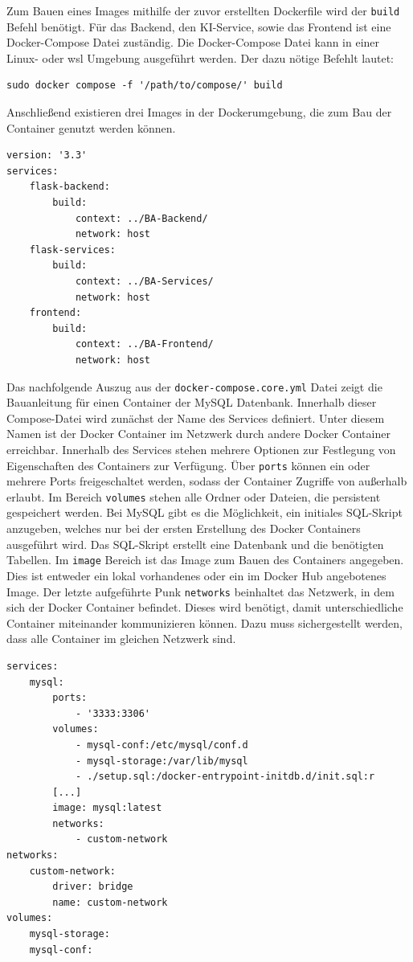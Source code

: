 Zum Bauen eines Images mithilfe der zuvor erstellten Dockerfile wird der \texttt{build} Befehl benötigt. Für das Backend, den KI-Service, sowie das Frontend ist eine Docker-Compose Datei zuständig. Die Docker-Compose Datei kann in einer Linux- oder \ac{wsl} Umgebung ausgeführt werden. Der dazu nötige Befehlt lautet:
\begin{lstlisting}
sudo docker compose -f '/path/to/compose/' build
\end{lstlisting}
Anschließend existieren drei Images in der Dockerumgebung, die zum Bau der Container genutzt werden können. 

\begin{lstlisting}
version: '3.3'
services: 
    flask-backend:
        build: 
            context: ../BA-Backend/
            network: host
    flask-services:
        build:
            context: ../BA-Services/
            network: host
    frontend:
        build:
            context: ../BA-Frontend/
            network: host
\end{lstlisting}

Das nachfolgende Auszug aus der \texttt{docker-compose.core.yml} Datei zeigt die Bauanleitung für einen Container der MySQL Datenbank. Innerhalb dieser Compose-Datei wird zunächst der Name des Services definiert. Unter diesem Namen ist der Docker Container im Netzwerk durch andere Docker Container erreichbar. Innerhalb des Services stehen mehrere Optionen zur Festlegung von Eigenschaften des Containers zur Verfügung. Über \texttt{ports} können ein oder mehrere Ports freigeschaltet werden, sodass der Container Zugriffe von außerhalb erlaubt. Im Bereich \texttt{volumes} stehen alle Ordner oder Dateien, die persistent gespeichert werden. Bei MySQL gibt es die Möglichkeit, ein initiales SQL-Skript anzugeben, welches nur bei der ersten Erstellung des Docker Containers ausgeführt wird. Das SQL-Skript erstellt eine Datenbank und die benötigten Tabellen. Im \texttt{image} Bereich ist das Image zum Bauen des Containers angegeben. Dies ist entweder ein lokal vorhandenes oder ein im Docker Hub angebotenes Image. Der letzte aufgeführte Punk \texttt{networks} beinhaltet das Netzwerk, in dem sich der Docker Container befindet. Dieses wird benötigt, damit unterschiedliche Container miteinander kommunizieren können. Dazu muss sichergestellt werden, dass alle Container im gleichen Netzwerk sind.

\begin{lstlisting}
services:
    mysql: 
        ports: 
            - '3333:3306'
        volumes: 
            - mysql-conf:/etc/mysql/conf.d
            - mysql-storage:/var/lib/mysql
            - ./setup.sql:/docker-entrypoint-initdb.d/init.sql:r
        [...]
        image: mysql:latest
        networks:
            - custom-network
networks: 
    custom-network:
        driver: bridge
        name: custom-network
volumes:
    mysql-storage:
    mysql-conf:
\end{lstlisting}

